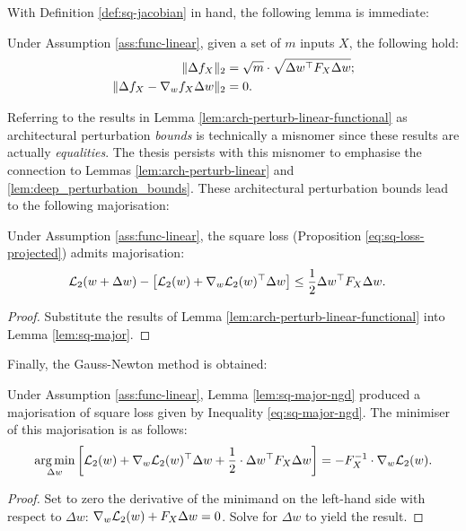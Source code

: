 \begin{refsection}
With Definition \ref{def:sq-jacobian} in hand, the following lemma is immediate:
\begin{lemma}\label{lem:arch-perturb-linear-functional}
Under Assumption \ref{ass:func-linear}, given a set of $m$ inputs $X$, the following hold:
\begin{align}
    \|\Delta f_X\|_2 &= \sqrt{m}\cdot\sqrt{\Delta w^\top F_X \Delta w}; \label{eq:ngd-func-change} \\
    \Vert {\Delta f_X - \nabla_w f_X \Delta w} \Vert_2 &= 0. \label{eq:ngd-lin}
\end{align}
\end{lemma}
Referring to the results in Lemma \ref{lem:arch-perturb-linear-functional} as architectural perturbation \textit{bounds} is technically a misnomer since these results are actually \textit{equalities}. The thesis persists with this misnomer to emphasise the connection to Lemmas \ref{lem:arch-perturb-linear} and \ref{lem:deep_perturbation_bounds}. These architectural perturbation bounds lead to the following majorisation:

\begin{lemma}\label{lem:sq-major-ngd} 
Under Assumption \ref{ass:func-linear}, the square loss (Proposition \ref{eq:sq-loss-projected}) admits majorisation:
    \begin{align}\label{eq:sq-major-ngd} &\mathcal{L}_2(w+\Delta w) -\left[ \mathcal{L}_2(w) + \nabla_w\mathcal{L}_2(w)^\top \Delta w\right] \leq \frac{1}{2} \Delta w^\top F_X \Delta w.
    \end{align}
\end{lemma}
\begin{proof}
Substitute the results of Lemma \ref{lem:arch-perturb-linear-functional} into Lemma \ref{lem:sq-major}.
\end{proof}

Finally, the Gauss-Newton method is obtained:
\begin{theorem} Under Assumption \ref{ass:func-linear}, Lemma \ref{lem:sq-major-ngd} produced a majorisation of square loss given by Inequality \ref{eq:sq-major-ngd}. The minimiser of this majorisation is as follows:
\begin{equation}
    \operatorname*{arg\,min}_{\Delta w}\left[\mathcal{L}_2(w) + \nabla_w \mathcal{L}_2(w)^\top\Delta w + \frac{1}{2}\cdot\Delta w^\top F_X \Delta w\right] = - F_X^{-1}\cdot\nabla_w \mathcal{L}_2(w).
\end{equation}
\end{theorem}
\begin{proof}
    Set to zero the derivative of the minimand on the left-hand side with respect to $\Delta w$: $\nabla_w \mathcal{L}_2(w) + F_X\Delta w = 0$. Solve for $\Delta w$ to yield the result.
\end{proof}


\end{refsection}
